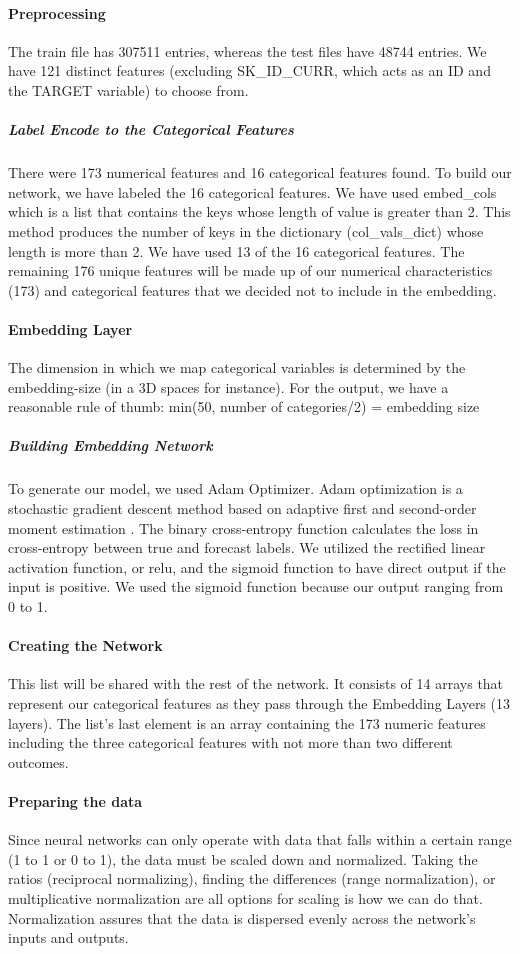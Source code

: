 \documentclass[sigconf, nonacm]{acmart}
\begin{document}
\paragraph{Preprocessing}
The train file has 307511 entries, whereas the test files have 48744 entries. We have 121 distinct features (excluding SK\_ID\_CURR, which acts as an ID and the TARGET variable) to choose from.
\subparagraph{Label Encode to the Categorical Features}
 There were 173 numerical features and 16 categorical features found. To build our network, we have labeled the 16 categorical features. We have used embed\_cols which is a list that contains the keys whose length of value is greater than 2. This method produces the number of keys in the dictionary (col\_vals\_dict) whose length is more than 2. We have used 13 of the 16 categorical features. The remaining 176 unique features will be made up of our numerical characteristics (173) and categorical features that we decided not to include in the embedding.
\paragraph{Embedding Layer}
The dimension in which we map categorical variables is determined by the embedding-size (in a 3D spaces for instance). For the output, we have a reasonable rule of thumb:
min(50, number of categories/2) = embedding size
\subparagraph{Building Embedding Network}
To generate our model, we used Adam Optimizer. Adam optimization is a stochastic gradient descent method based on adaptive first and second-order moment estimation . The binary cross-entropy function calculates the loss in cross-entropy between true and forecast labels. We utilized the rectified linear activation function, or relu, and the sigmoid function to have direct output if the input is positive. We used the sigmoid function because our output ranging from 0 to 1.
\paragraph{Creating the Network}
This list will be shared with the rest of the network. It consists of 14 arrays that represent our categorical features as they pass through the Embedding Layers (13 layers). The list's last element is an array containing the 173 numeric features including the three categorical features with not more than two different outcomes.
\paragraph{Preparing the data}
Since neural networks can only operate with data that falls within a certain range (1 to 1 or 0 to 1), the data must be scaled down and normalized. Taking the ratios (reciprocal normalizing), finding the differences (range normalization), or multiplicative normalization are all options for scaling is how we can do that. Normalization assures that the data is dispersed evenly across the network's inputs and outputs.
\end{document}
